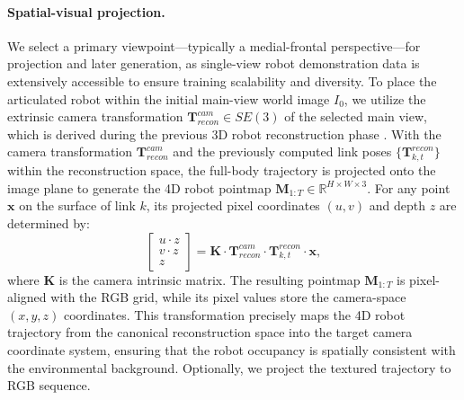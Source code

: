 \paragraph{Spatial-visual projection.}
We select a primary viewpoint—typically a medial-frontal perspective—for projection and later generation, as single-view robot demonstration data is extensively accessible to ensure training scalability and diversity. 
To place the articulated robot within the initial main-view world image $I_0$, we utilize the extrinsic camera transformation $\mathbf{T}_{recon}^{cam} \in SE(3)$ of the selected main view, which is derived during the previous 3D robot reconstruction phase \cite{chang2025reconviagen}.
With the camera transformation $\mathbf{T}_{recon}^{cam}$ and the previously computed link poses $\{\mathbf{T}_{k,t}^{recon}\}$ within the reconstruction space, the full-body trajectory is projected onto the image plane to generate the 4D robot pointmap $\mathbf{M}_{1:T} \in \mathbb{R}^{H \times W \times 3}$. For any point $\mathbf{x}$ on the surface of link $k$, its projected pixel coordinates $(u, v)$ and depth $z$ are determined by: 
{\scriptsize
\begin{equation}
\begin{bmatrix} u \cdot z \\ v \cdot z \\ z \end{bmatrix} = \mathbf{K} \cdot \mathbf{T}_{recon}^{cam} \cdot \mathbf{T}_{k,t}^{recon} \cdot \mathbf{x},
\end{equation}
} 
where $\mathbf{K}$ is the camera intrinsic matrix. The resulting pointmap $\mathbf{M}_{1:T}$ is pixel-aligned with the RGB grid, while its pixel values store the camera-space $(x, y, z)$ coordinates. This transformation precisely maps the 4D robot trajectory from the canonical reconstruction space into the target camera coordinate system, ensuring that the robot occupancy is spatially consistent with the environmental background. 
Optionally, we project the textured trajectory to RGB sequence. 


